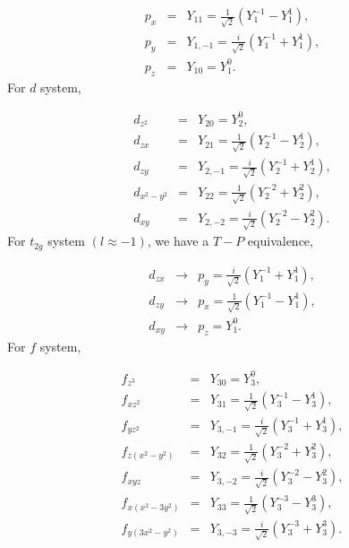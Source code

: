 \begin{eqnarray}
p_{x} & = & Y_{11}=\frac{1}{\sqrt{2}}\left(Y_{1}^{-1}-Y_{1}^{1}\right),\nonumber \\
p_{y} & = & Y_{1,-1}=\frac{i}{\sqrt{2}}\left(Y_{1}^{-1}+Y_{1}^{1}\right),\\
p_{z} & = & Y_{10}=Y_{1}^{0}.\nonumber 
\end{eqnarray}
For $d$ system,

\begin{eqnarray}
d_{z^{2}} & = & Y_{20}=Y_{2}^{0},\nonumber \\
d_{zx} & = & Y_{21}=\frac{1}{\sqrt{2}}\left(Y_{2}^{-1}-Y_{2}^{1}\right),\nonumber \\
d_{zy} & = & Y_{2,-1}=\frac{i}{\sqrt{2}}\left(Y_{2}^{-1}+Y_{2}^{1}\right),\\
d_{x^{2}-y^{2}} & = & Y_{22}=\frac{1}{\sqrt{2}}\left(Y_{2}^{-2}+Y_{2}^{2}\right),\nonumber \\
d_{xy} & = & Y_{2,-2}=\frac{i}{\sqrt{2}}\left(Y_{2}^{-2}-Y_{2}^{2}\right).\nonumber 
\end{eqnarray}
For $t_{2g}$ system $(l\approx-1)$, we have a $T-P$ equivalence, 

\begin{eqnarray}
d_{zx} & \rightarrow & p_{y}=\frac{i}{\sqrt{2}}\left(Y_{1}^{-1}+Y_{1}^{1}\right),\nonumber \\
d_{zy} & \rightarrow & p_{x}=\frac{1}{\sqrt{2}}\left(Y_{1}^{-1}-Y_{1}^{1}\right),\\
d_{xy} & \rightarrow & p_{z}=Y_{1}^{0}.\nonumber 
\end{eqnarray}
For $f$ system, 

\begin{eqnarray}
f_{z^{3}} & = & Y_{30}=Y_{3}^{0},\nonumber \\
f_{xz^{2}} & = & Y_{31}=\frac{1}{\sqrt{2}}\left(Y_{3}^{-1}-Y_{3}^{1}\right),\nonumber \\
f_{yz^{2}} & = & Y_{3,-1}=\frac{i}{\sqrt{2}}\left(Y_{3}^{-1}+Y_{3}^{1}\right),\nonumber \\
f_{z(x^{2}-y^{2})} & = & Y_{32}=\frac{1}{\sqrt{2}}\left(Y_{3}^{-2}+Y_{3}^{2}\right),\\
f_{xyz} & = & Y_{3,-2}=\frac{i}{\sqrt{2}}\left(Y_{3}^{-2}-Y_{3}^{2}\right),\nonumber \\
f_{x(x^{2}-3y^{2})} & = & Y_{33}=\frac{1}{\sqrt{2}}\left(Y_{3}^{-3}-Y_{3}^{3}\right),\nonumber \\
f_{y(3x^{2}-y^{2})} & = & Y_{3,-3}=\frac{i}{\sqrt{2}}\left(Y_{3}^{-3}+Y_{3}^{3}\right).\nonumber 
\end{eqnarray}



